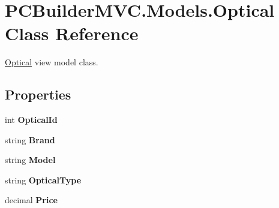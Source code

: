 \hypertarget{class_p_c_builder_m_v_c_1_1_models_1_1_optical}{}\section{P\+C\+Builder\+M\+V\+C.\+Models.\+Optical Class Reference}
\label{class_p_c_builder_m_v_c_1_1_models_1_1_optical}


\hyperlink{class_p_c_builder_m_v_c_1_1_models_1_1_optical}{Optical} view model class.  


\subsection*{Properties}
\begin{DoxyCompactItemize}
\item 
int {\bfseries Optical\+Id}\hypertarget{class_p_c_builder_m_v_c_1_1_models_1_1_optical_ad8f51257139f512f0ec6ad54fca96905}{}\label{class_p_c_builder_m_v_c_1_1_models_1_1_optical_ad8f51257139f512f0ec6ad54fca96905}

\item 
string {\bfseries Brand}\hypertarget{class_p_c_builder_m_v_c_1_1_models_1_1_optical_a1b25c8c270d28d22aaa6d48644c57962}{}\label{class_p_c_builder_m_v_c_1_1_models_1_1_optical_a1b25c8c270d28d22aaa6d48644c57962}

\item 
string {\bfseries Model}\hypertarget{class_p_c_builder_m_v_c_1_1_models_1_1_optical_a0529bf610b4aaa363b423caf26200c10}{}\label{class_p_c_builder_m_v_c_1_1_models_1_1_optical_a0529bf610b4aaa363b423caf26200c10}

\item 
string {\bfseries Optical\+Type}\hypertarget{class_p_c_builder_m_v_c_1_1_models_1_1_optical_a8e452e1102a79129f77286b425bd780a}{}\label{class_p_c_builder_m_v_c_1_1_models_1_1_optical_a8e452e1102a79129f77286b425bd780a}

\item 
decimal {\bfseries Price}\hypertarget{class_p_c_builder_m_v_c_1_1_models_1_1_optical_a70c467d88703603c376033c4d4058dc0}{}\label{class_p_c_builder_m_v_c_1_1_models_1_1_optical_a70c467d88703603c376033c4d4058dc0}

\end{DoxyCompactItemize}


